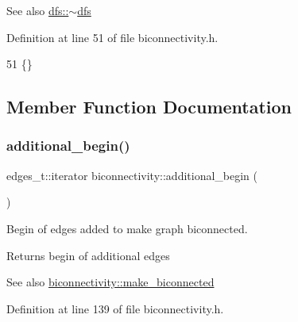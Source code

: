 \begin{DoxySeeAlso}{See also}
\mbox{\hyperlink{classdfs_aff2e95c12935221a94551393f7e36c6e}{dfs\+::$\sim$dfs}} 
\end{DoxySeeAlso}


Definition at line 51 of file biconnectivity.\+h.


\begin{DoxyCode}
51 \{\}
\end{DoxyCode}


\subsection{Member Function Documentation}
\mbox{\label{classbiconnectivity_a9560cdde8a90c12760b9930c494be410}} 
\subsubsection{\texorpdfstring{additional\+\_\+begin()}{additional\_begin()}}
{\footnotesize\ttfamily edges\+\_\+t\+::iterator biconnectivity\+::additional\+\_\+begin (\begin{DoxyParamCaption}{ }\end{DoxyParamCaption})\hspace{0.3cm}{\ttfamily [inline]}}



Begin of edges added to make graph biconnected. 

\begin{DoxyReturn}{Returns}
begin of additional edges 
\end{DoxyReturn}
\begin{DoxySeeAlso}{See also}
\mbox{\hyperlink{classbiconnectivity_a774fd08203a6d164605afc4cdc8b9201}{biconnectivity\+::make\+\_\+biconnected}} 
\end{DoxySeeAlso}


Definition at line 139 of file biconnectivity.\+h.


